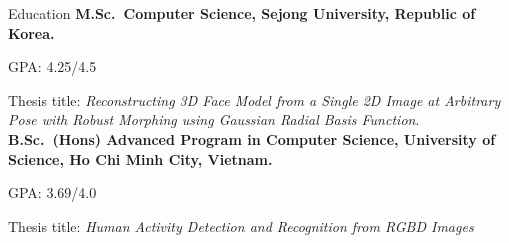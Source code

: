 \begin{rubric}{Education}
\entry*[03/2017 -- 03/2019]%
	\textbf{M.Sc.~Computer Science, Sejong University, Republic of Korea.}\par
	GPA: 4.25/4.5 \par
 	Thesis title: \emph{Reconstructing 3D Face Model from a Single 2D Image at Arbitrary Pose with Robust Morphing using Gaussian Radial Basis Function}.
%
\entry*[10/2012 -- 11/2016]%
	\textbf{B.Sc.~(Hons) Advanced Program in Computer Science, University of Science, Ho Chi Minh City, Vietnam.}\par
    GPA: 3.69/4.0 \par 
    Thesis title: \emph{Human Activity Detection and Recognition from RGBD Images}
	
%
\end{rubric}